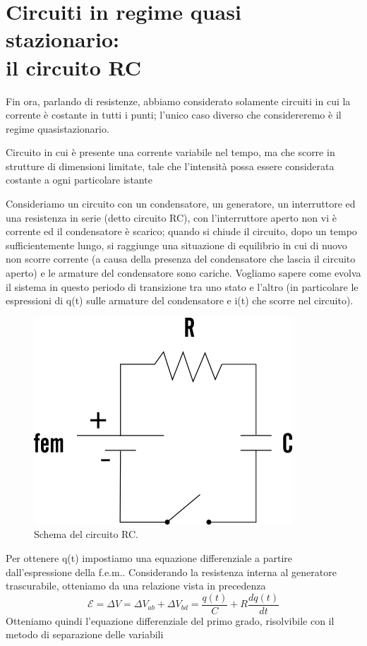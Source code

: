 \documentclass[
10pt, %
a4paper, %
oneside, %
headinclude,footinclude, %
BCOR5mm, %
]{scrartcl}
\begin{document}
\section{Circuiti in regime quasi stazionario:\\ il circuito RC}
Fin ora, parlando di resistenze, abbiamo considerato solamente circuiti in cui la corrente è costante in tutti i punti; l'unico caso diverso che considereremo è il regime quasistazionario.
\begin{definizione}
	Circuito in cui è presente una corrente variabile nel tempo, ma che scorre in strutture di dimensioni limitate, tale che l'intensità possa essere considerata costante a ogni particolare istante
\end{definizione}
Consideriamo un circuito con un condensatore, un generatore, un interruttore ed una resistenza in serie (detto circuito RC), con l'interruttore aperto non vi è corrente ed il condensatore è scarico; quando si chiude il circuito, dopo un tempo sufficientemente lungo, si raggiunge una situazione di equilibrio in cui di nuovo non scorre corrente (a causa della presenza del condensatore che lascia il circuito aperto) e le armature del condensatore sono cariche. Vogliamo sapere come evolva il sistema in questo periodo di transizione tra uno stato e l'altro (in particolare le espressioni di q(t) sulle armature del condensatore e i(t) che scorre nel circuito). 
\begin{figure}[h!]
	\centering
	\includegraphics[width=0.5\linewidth]{../images/circuito-rc}
	\caption{Schema del circuito RC.}
	\label{fig:circuito-rc}
\end{figure}
\FloatBarrier
Per ottenere q(t) impostiamo una equazione differenziale a partire dall'espressione della f.e.m.. Considerando la resistenza interna al generatore trascurabile, otteniamo da una relazione vista in precedenza 
\[\mathcal{E} = \Delta V = \Delta V_{ab} + \Delta V_{bd} = \frac{q(t)}{C}+R\frac{dq(t)}{dt}\]
Otteniamo quindi l'equazione differenziale del primo grado, risolvibile con il metodo di separazione delle variabili
\end{document}
